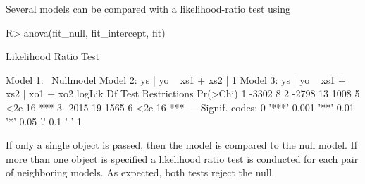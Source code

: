 \documentclass[%
    twoside, openright, titlepage, numbers=noenddot,%
    cleardoublepage=empty,%
    abstract=false,%
    BCOR=5.5mm, paper=a5, fontsize=10pt,%
]{scrreprt}
\begin{document}
Several models can be compared with a likelihood-ratio test using
%
\begin{Schunk}
\begin{Sinput}
R> anova(fit_null, fit_intercept, fit)
\end{Sinput}
\begin{Soutput}
Likelihood Ratio Test

Model 1: ~Nullmodel
Model 2: ys | yo ~ xs1 + xs2 | 1
Model 3: ys | yo ~ xs1 + xs2 | xo1 + xo2
  logLik    Df  Test Restrictions Pr(>Chi)    
1  -3302     8                                
2  -2798    13  1008            5   <2e-16 ***
3  -2015    19  1565            6   <2e-16 ***
---
Signif. codes:  0 '***' 0.001 '**' 0.01 '*' 0.05 '.' 0.1 ' ' 1
\end{Soutput}
\end{Schunk}
%
If only a single object is passed, then the model is compared to the null model. If more than one object is specified a likelihood ratio test is conducted for each pair of neighboring models. As expected, both tests reject the null.
\end{document}
